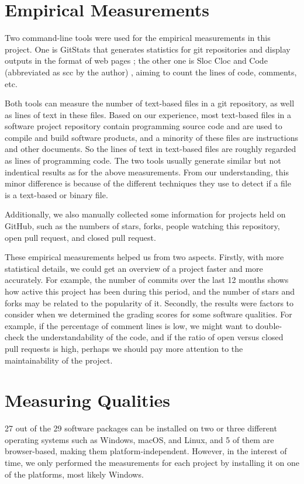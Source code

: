 \section{Empirical Measurements}
\label{sec_empirical_measurements}

Two command-line tools were used for the empirical measurements in this project. One is GitStats that generates statistics for git repositories and display outputs in the format of web pages \cite{Gieniusz2019}; the other one is Sloc Cloc and Code (abbreviated as scc by the author) \cite{Boyter2021}, aiming to count the lines of code, comments, etc.

Both tools can measure the number of text-based files in a git repository, as well as lines of text in these files. Based on our experience, most text-based files in a software project repository contain programming source code and are used to compile and build software products, and a minority of these files are instructions and other documents. So the lines of text in text-based files are roughly regarded as lines of programming code. The two tools usually generate similar but not indentical results as for the above measurements. From our understanding, this minor difference is because of the different techniques they use to detect if a file is a text-based or binary file.

Additionally, we also manually collected some information for projects held on GitHub, such as the numbers of stars, forks, people watching this repository, open pull request, and closed pull request.

These empirical measurements helped us from two aspects. Firstly, with more statistical details, we could get an overview of a project faster and more accurately. For example, the number of commits over the last 12 months shows how active this project has been during this period, and the number of stars and forks may be related to the popularity of it. Secondly, the results were factors to consider when we determined the grading scores for some software qualities. For example, if the percentage of comment lines is low, we might want to double-check the understandability of the code, and if the ratio of open versus closed pull requests is high, perhaps we should pay more attention to the maintainability of the project.

\section{Measuring Qualities}
\label{sec_measuring_qualities}
27 out of the 29 software packages can be installed on two or three different operating systems such as Windows, macOS, and Linux, and 5 of them are browser-based, making them platform-independent. However, in the interest of time, we only performed the measurements for each project by installing it on one of the platforms, most likely Windows.

